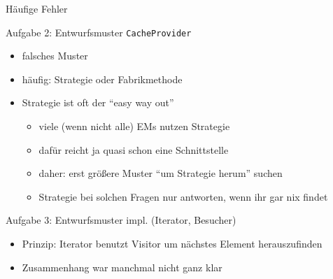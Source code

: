 \documentclass[18pt]{beamer}
\begin{document}
	\begin{frame}{Häufige Fehler}
		\begin{block}{Aufgabe 2: Entwurfsmuster \texttt{CacheProvider}}
			\begin{itemize}
				\item falsches Muster
				\item häufig: Strategie oder Fabrikmethode \pause
				\item Strategie ist oft der \enquote{easy way out}
				\begin{itemize}
					\item viele (wenn nicht alle) EMs nutzen Strategie
					\item dafür reicht ja quasi schon eine Schnittstelle \pause
					\item daher: erst größere Muster \enquote{um Strategie herum} suchen
					\item Strategie bei solchen Fragen nur antworten, wenn ihr gar nix findet
				\end{itemize}
			\end{itemize}
		\end{block}
		\pause 
		\begin{block}{Aufgabe 3: Entwurfsmuster impl. (Iterator, Besucher)}
			\begin{itemize}
				\item Prinzip: Iterator benutzt Visitor um nächstes Element herauszufinden
				\item Zusammenhang war manchmal nicht ganz klar
			\end{itemize}
		\end{block}
	\end{frame}
\end{document}
